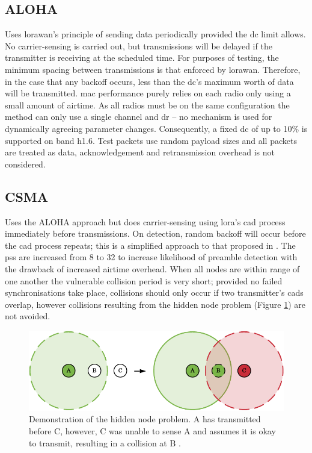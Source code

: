 \subsection{ALOHA}
Uses \ac{lorawan}'s principle of sending data periodically provided the \ac{dc} limit allows. No carrier-sensing is carried out, but transmissions will be delayed if the transmitter is receiving at the scheduled time. For purposes of testing, the minimum spacing between transmissions is that enforced by \ac{lorawan}. Therefore, in the case that any backoff occurs, less than the \ac{dc}'s maximum worth of data will be transmitted. \ac{mac} performance purely relies on each radio only using a small amount of airtime. As all radios must be on the same configuration the method can only use a single channel and \ac{dr} -- no mechanism is used for dynamically agreeing parameter changes. Consequently, a fixed \ac{dc} of up to 10\% is supported on band h1.6. Test packets use random payload sizes and all packets are treated as data, acknowledgement and retransmission overhead is not considered.

\subsection{CSMA}
Uses the ALOHA approach but does carrier-sensing using \ac{lora}'s \ac{cad} process immediately before transmissions. On detection, random backoff will occur before the \ac{cad} process repeats; this is a simplified approach to that proposed in \cite{3YP:LORA_CSMA}. The \ac{ps}s are increased from 8 to 32 to increase likelihood of preamble detection with the drawback of increased airtime overhead. When all nodes are within range of one another the vulnerable collision period is very short; provided no failed synchronisations take place, collisions should only occur if two transmitter's \ac{cad}s overlap, however collisions resulting from the hidden node problem (Figure \ref{fig:hidden_node_problem}) are not avoided.

\begin{figure}[H]
    \centering
   	\includegraphics{Figures/hidden_node_problem}
    \caption[Demonstration of hidden node problem]{
    	Demonstration of the hidden node problem. A has transmitted before C, however, C was unable to sense A and assumes it is okay to transmit, resulting in a collision at B \cite{3YP:WSN_BOOK}.
    }
    \label{fig:hidden_node_problem}
\end{figure}


